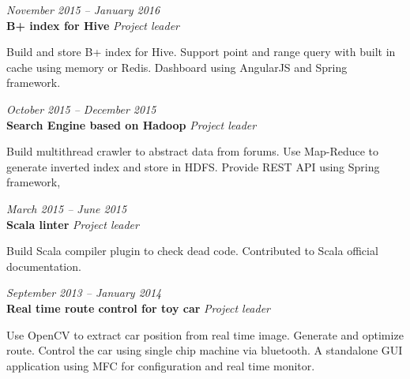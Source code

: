 \documentclass[fontsize=10pt]{tccv}
\begin{document}
\begin{eventlist}


\textit{November 2015 -- January 2016} \\
\textbf{B+ index for Hive} \textit{Project leader}\smallskip

Build and store B+ index for Hive.
Support point and range query with built in cache using
memory or Redis.
Dashboard using AngularJS and Spring framework.

\medskip

\textit{October 2015 -- December 2015} \\
\textbf{Search Engine based on Hadoop} \textit{Project leader}\smallskip

Build multithread crawler to abstract data from forums.
Use Map-Reduce to generate inverted index and store in HDFS.
Provide REST API using Spring framework,

\medskip

\textit{March 2015 -- June 2015} \\
\textbf{Scala linter} \textit{Project leader}\smallskip

Build Scala compiler plugin to check dead code.
Contributed to Scala official documentation.

\medskip


\textit{September 2013 -- January 2014} \\
\textbf{Real time route control for toy car} \textit{Project leader}\smallskip

Use OpenCV to extract car position from real time image.
Generate and optimize route. Control the car using single
chip machine via bluetooth.
A standalone GUI application using MFC for configuration and
real time monitor.


\end{eventlist}
\end{document}
